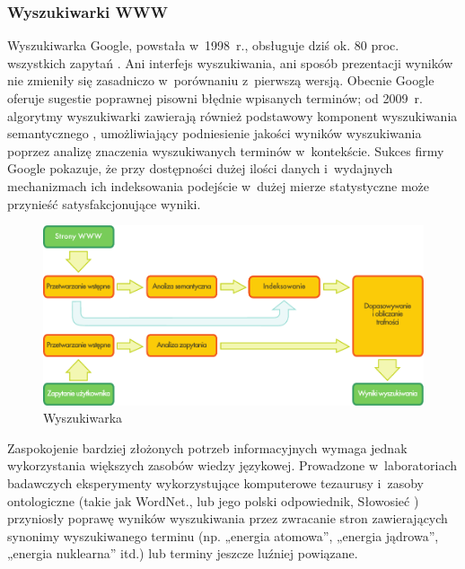 \begin{multicols}{2}
\subsubsection[Wyszukiwarki WWW]{Wyszukiwarki WWW} Wyszukiwarka
Google, powstała w~1998~r., obsługuje dziś ok. 80 proc. wszystkich
zapytań \cite{spi1}. Ani interfejs wyszukiwania, ani sposób
prezentacji wyników nie zmieniły się zasadniczo w~porównaniu
z~pierwszą wersją. Obecnie Google oferuje sugestie poprawnej pisowni
błędnie wpisanych terminów; od 2009~r. algorytmy wyszukiwarki
zawierają również podstawowy komponent wyszukiwania semantycznego
\cite{pc1}, umożliwiający podniesienie jakości wyników
wyszukiwania poprzez analizę znaczenia wyszukiwanych terminów
w~kontekście. Sukces firmy Google pokazuje, że przy dostępności
dużej ilości danych i~wydajnych mechanizmach ich indeksowania
podejście w~dużej mierze statystyczne może przynieść
satysfakcjonujące wyniki. 

\begin{figure}[htb]  \center
\includegraphics[width=\textwidth]{../_media/polish/web_search_architecture}
\caption{Wyszukiwarka} \label{fig:websearcharch_pl}
 \end{figure} 


Zaspokojenie bardziej złożonych potrzeb informacyjnych wymaga jednak
wykorzystania większych zasobów wiedzy językowej. Prowadzone
w~laboratoriach badawczych eksperymenty wykorzystujące komputerowe
tezaurusy i~zasoby ontologiczne (takie jak WordNet., lub jego polski
odpowiednik, Słowosieć \cite{Slowosiec1, Piasecki2009}) przyniosły
poprawę wyników wyszukiwania przez zwracanie stron zawierających
synonimy wyszukiwanego terminu (np. „energia atomowa”, „energia
jądrowa”, „energia nuklearna” itd.) lub terminy jeszcze
luźniej powiązane.


\end{multicols}
